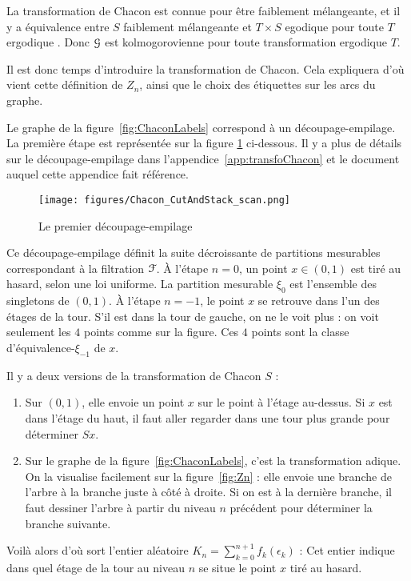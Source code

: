 \documentclass[12pt,a4paper]{article}
\begin{document}
La transformation de Chacon est connue pour être faiblement mélangeante,  
et il y a équivalence entre \og $S$ faiblement mélangeante \fg{} et 
\og $T\times S$ egodique pour toute $T$ ergodique \fg. 
Donc $\EuScript{G}$ est kolmogorovienne pour toute transformation ergodique $T$. 

{\scriptsize %
Il est donc temps d'introduire la transformation de Chacon. 
Cela expliquera d'où vient cette définition de $Z_n$, ainsi que le choix 
des étiquettes sur les arcs du graphe. 

Le graphe de la figure~\ref{fig:ChaconLabels} correspond à un découpage-empilage. 
La première étape est représentée sur la figure \ref{fig:scan} ci-dessous.
Il y a plus de détails sur le découpage-empilage dans l'appendice~\ref{app:transfoChacon} et 
le document auquel cette appendice fait référence.

\begin{figure}[!h]
\centering
	\texttt{[image: figures/Chacon\_CutAndStack\_scan.png]}
\caption{Le premier découpage-empilage}\label{fig:scan}
\end{figure}

Ce découpage-empilage définit la suite décroissante de partitions mesurables 
correspondant à la filtration $\EuScript{F}$. 
À l'étape $n=0$, un point $x \in (0,1)$ est tiré au hasard, selon une loi uniforme. 
La partition mesurable $\xi_0$ est l'ensemble des singletons de $(0,1)$. 
À l'étape $n=-1$, le point $x$ se retrouve dans l'un des étages de la tour. 
S'il est dans la tour de gauche, on ne le voit plus : on voit 
seulement les $4$ points comme sur la figure. Ces $4$ points sont la classe 
d'équivalence-$\xi_{-1}$ de $x$.  

Il y a deux versions de la transformation de Chacon $S$ :
\begin{enumerate}
\item Sur $(0,1)$, elle envoie un point $x$ sur le point à l'étage au-dessus. 
Si $x$ est dans l'étage du haut, il faut aller regarder dans une tour plus grande 
pour déterminer $Sx$. 

\item Sur le graphe de la  figure~\ref{fig:ChaconLabels}, c'est la transformation adique. 
On la visualise facilement sur la figure~\ref{fig:Zn} : elle envoie une branche 
de l'arbre à la branche juste à côté à droite. Si on est à la dernière branche, 
il faut dessiner l'arbre à partir du niveau $n$ précédent pour déterminer la 
branche suivante. 
\end{enumerate}

Voilà alors d'où sort l'entier aléatoire 
$K_n=\sum_{k=0}^{n+1}f_k(\epsilon_k)$ : 
Cet entier indique dans quel étage de la tour au niveau $n$ se situe 
le point $x$ tiré au hasard. 
}
\end{document}
